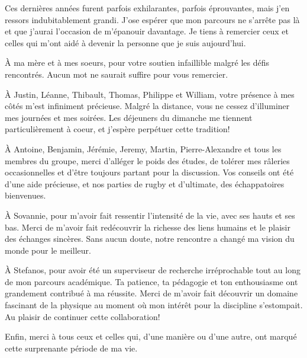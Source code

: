 Ces dernières années furent parfois exhilarantes, parfois éprouvantes, mais j'en ressors indubitablement grandi. J'ose espérer que mon parcours ne s'arrête pas là et que j'aurai l'occasion de m'épanouir davantage. Je tiens à remercier ceux et celles qui m'ont aidé à devenir la personne que je suis aujourd'hui.

À ma mère et à mes soeurs, pour votre soutien infaillible malgré les défis rencontrés. Aucun mot ne saurait suffire pour vous remercier.

À Justin, Léanne, Thibault, Thomas, Philippe et William, votre présence à mes côtés m'est infiniment précieuse. Malgré la distance, vous ne cessez d'illuminer mes journées et mes soirées. Les déjeuners du dimanche me tiennent particulièrement à coeur, et j'espère perpétuer cette tradition!

À Antoine, Benjamin, Jérémie, Jeremy, Martin, Pierre-Alexandre et tous les membres du groupe, merci d'alléger le poids des études, de tolérer mes râleries occasionnelles et d'être toujours partant pour la discussion. Vos conseils ont été d'une aide précieuse, et nos parties de rugby et d'ultimate, des échappatoires bienvenues.

À Sovannie, pour m'avoir fait ressentir l'intensité de la vie, avec ses hauts et ses bas. Merci de m'avoir fait redécouvrir la richesse des liens humains et le plaisir des échanges sincères. Sans aucun doute, notre rencontre a changé ma vision du monde pour le meilleur.

À Stefanos, pour avoir été un superviseur de recherche irréprochable tout au long de mon parcours académique. Ta patience, ta pédagogie et ton enthousiasme ont grandement contribué à ma réussite. Merci de m'avoir fait découvrir un domaine fascinant de la physique au moment où mon intérêt pour la discipline s'estompait. Au plaisir de continuer cette collaboration!

Enfin, merci à tous ceux et celles qui, d'une manière ou d'une autre, ont marqué cette surprenante période de ma vie.

